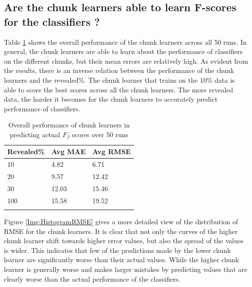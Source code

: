 \subsection{Are the chunk learners able to learn F-scores for the classifiers ?}
\label{SubsectionFScoreResults}
Table \ref{TableOverallErrors} shows the overall performance of the chunk learners across all 50 runs.
In general, the chunk learners are able to learn about the performance of classifiers on the different chunks, but their mean errors are relatively high.
As evident from the results, there is an inverse relation between the performance of the chunk learners and the revealed\%.
The chunk learner that trains on the 10\% data is able to score the best scores across all the chunk learners.
The more revealed data, the harder it becomes for the chunk learners to accurately predict performance of classifiers.

\begin{table}[hbt!]
    \setlength\extrarowheight{2pt} %
    \begin{tabularx}{\textwidth}{|X|X|X|}
    \hline
    \textbf{Revealed\%} & \textbf{Avg MAE} & \textbf{Avg RMSE} \\ \hline
        10 & 4.82 & 6.71 \\ \hline
        20 & 9.57 & 12.42 \\ \hline
        30 & 12.03 & 15.46 \\ \hline
        100 & 15.58 & 19.52 \\ \hline
      \caption{Overall performance of chunk learners in predicting actual $F_{\beta}$ scores over 50 runs}
      \label{TableOverallErrors}
      \end{tabularx}
  \end{table}

Figure \ref{Img:HistogramRMSE} gives a more detailed view of the distribution of RMSE for the chunk learners.
It is clear that not only the curves of the higher chunk learner shift towards higher error values, but also the spread of the values is wider.
This indicates that few of the predictions made by the lower chunk learner are significantly worse than their actual values.
While the higher chunk learner is generally worse and makes larger mistakes by predicting values that are clearly worse than the actual performance of the classifiers.

